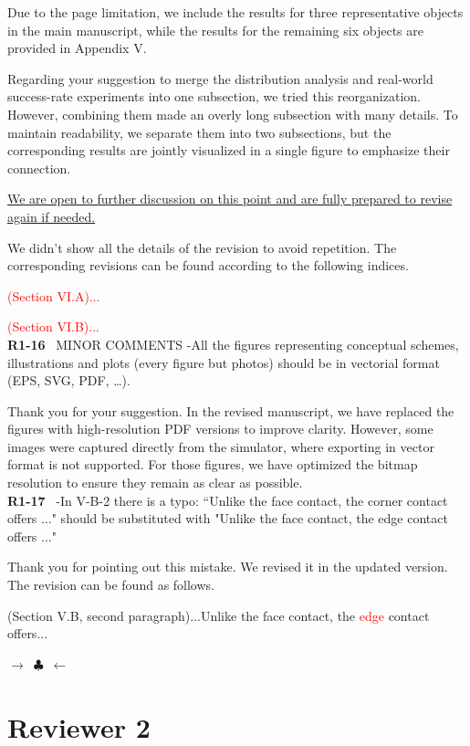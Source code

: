 \documentclass[journal]{IEEEtran}
\newcommand{\rev}[1]{\textcolor{red}{#1}}
\newcommand{\ornamentbreak}{%
\begin{center}
    $\longrightarrow$~$\clubsuit$~$\longleftarrow$
  \end{center}
}
\begin{document}
Due to the page limitation, we include the results for three representative objects in the main manuscript, while the results for the remaining six objects are provided in Appendix V.

Regarding your suggestion to merge the distribution analysis and real-world success-rate experiments into one subsection, we tried this reorganization. However, combining them made an overly long subsection with many details. To maintain readability, we separate them into two subsections, but the corresponding results are jointly visualized in a single figure to emphasize their connection.

\uline{We are open to further discussion on this point and are fully prepared to revise again if needed.}

We didn't show all the details of the revision to avoid repetition. The corresponding revisions can be found according to the following indices. 

\rev{(Section VI.A)...}

\rev{(Section VI.B)...}
\\


\noindent
{\textbf{\color{black}R1-16}\color{gray}~
MINOR COMMENTS
-All the figures representing conceptual schemes, illustrations and plots (every figure but photos) should be in vectorial format (EPS, SVG, PDF, …).
}

Thank you for your suggestion. In the revised manuscript, we have replaced the figures with high-resolution PDF versions to improve clarity. However, some images were captured directly from the simulator, where exporting in vector format is not supported. For those figures, we have optimized the bitmap resolution to ensure they remain as clear as possible.
\\

\noindent
{\textbf{\color{black}R1-17}\color{gray}~
-In V-B-2 there is a typo: ``Unlike the face contact, the corner contact
offers ..." should be substituted with "Unlike the face contact, the edge contact
offers ..."
}

Thank you for pointing out this mistake. We revised it in the updated version. The revision can be found as follows.

(Section V.B, second paragraph)...Unlike the face contact, the \rev{edge} contact
offers...
\\
\ornamentbreak

\section{Reviewer 2}
\end{document}
